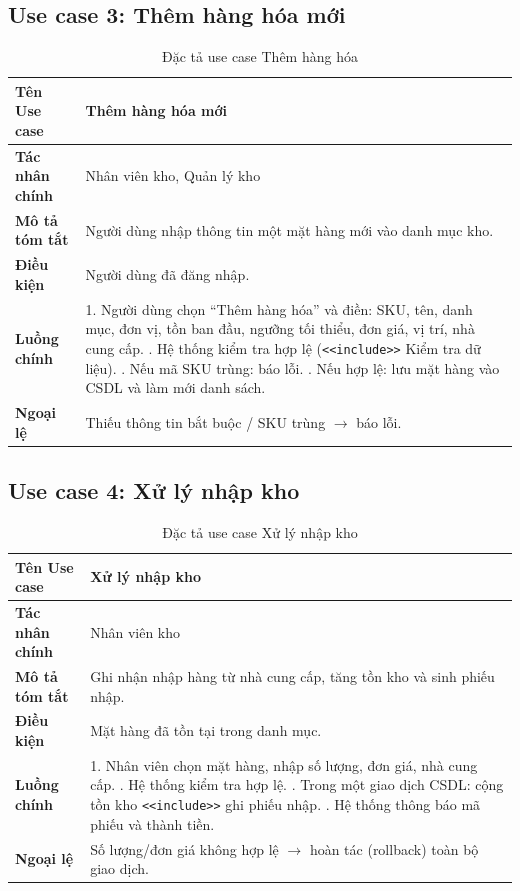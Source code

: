 \documentclass[12pt,a4paper]{report}
\begin{document}
\subsection{Use case 3: Thêm hàng hóa mới}
\begin{table}[H]
\centering
\renewcommand{\arraystretch}{1.3}
\begin{tabularx}{\textwidth}{|L{3.2cm}|X|}
\hline
\textbf{Tên Use case} & Thêm hàng hóa mới \\ \hline
\textbf{Tác nhân chính} & Nhân viên kho, Quản lý kho \\ \hline
\textbf{Mô tả tóm tắt} & Người dùng nhập thông tin một mặt hàng mới vào danh mục kho. \\ \hline
\textbf{Điều kiện} & Người dùng đã đăng nhập. \\ \hline
\textbf{Luồng chính} &
1. Người dùng chọn ``Thêm hàng hóa'' và điền: SKU, tên, danh mục, đơn vị, tồn ban đầu, ngưỡng tối thiểu, đơn giá, vị trí, nhà cung cấp. . Hệ thống kiểm tra hợp lệ (\texttt{<<include>>} Kiểm tra dữ liệu). . Nếu mã SKU trùng: báo lỗi. . Nếu hợp lệ: lưu mặt hàng vào CSDL và làm mới danh sách. \\ \hline
\textbf{Ngoại lệ} & Thiếu thông tin bắt buộc / SKU trùng $\rightarrow$ báo lỗi. \\ \hline
\end{tabularx}
\caption{Đặc tả use case Thêm hàng hóa}
\end{table}

\subsection{Use case 4: Xử lý nhập kho}
\begin{table}[H]
\centering
\renewcommand{\arraystretch}{1.3}
\begin{tabularx}{\textwidth}{|L{3.2cm}|X|}
\hline
\textbf{Tên Use case} & Xử lý nhập kho \\ \hline
\textbf{Tác nhân chính} & Nhân viên kho \\ \hline
\textbf{Mô tả tóm tắt} & Ghi nhận nhập hàng từ nhà cung cấp, tăng tồn kho và sinh phiếu nhập. \\ \hline
\textbf{Điều kiện} & Mặt hàng đã tồn tại trong danh mục. \\ \hline
\textbf{Luồng chính} &
1. Nhân viên chọn mặt hàng, nhập số lượng, đơn giá, nhà cung cấp. . Hệ thống kiểm tra hợp lệ. . Trong một giao dịch CSDL: cộng tồn kho \texttt{<<include>>} ghi phiếu nhập. . Hệ thống thông báo mã phiếu và thành tiền. \\ \hline
\textbf{Ngoại lệ} & Số lượng/đơn giá không hợp lệ $\rightarrow$ hoàn tác (rollback) toàn bộ giao dịch. \\ \hline
\end{tabularx}
\caption{Đặc tả use case Xử lý nhập kho}
\end{table}
\end{document}
